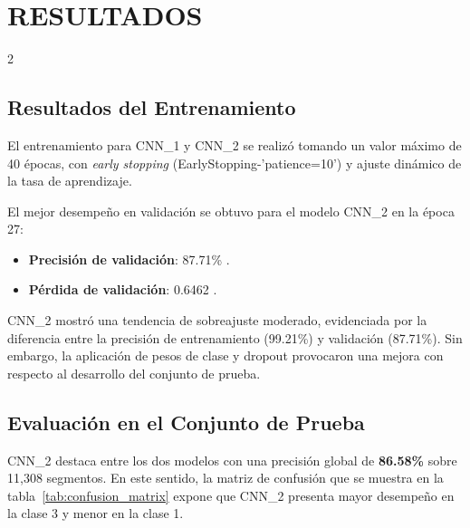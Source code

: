 \documentclass[12pt]{report}
\newenvironment{tightmulticols}{%
  \begin{multicols}{2}
  \setlength{\parskip}{1.2pt}
  \linespread{1}\selectfont
}{%
  \end{multicols}
}
\begin{document}
\pagebreak


\chapter{RESULTADOS}
\vspace{-3em}

\begin{tightmulticols}

\section{Resultados del Entrenamiento}

\noindent El entrenamiento para CNN\_1 y CNN\_2 se realizó tomando un valor máximo de 40 épocas, con \textit{early stopping} (EarlyStopping-'patience=10') y ajuste dinámico de la tasa de aprendizaje.

\par El mejor desempeño en validación se obtuvo para el modelo CNN\_2 en la época 27:

\begin{itemize}
    \item \textbf{Precisión de validación}: 87.71\% .
    \item \textbf{Pérdida de validación}: 0.6462 .
\end{itemize}

\noindent CNN\_2 mostró una tendencia de sobreajuste moderado, evidenciada por la diferencia entre la precisión de entrenamiento (99.21\%) y validación (87.71\%). Sin embargo, la aplicación de pesos de clase y dropout provocaron una mejora con respecto al desarrollo del conjunto de prueba.

\section{Evaluación en el Conjunto de Prueba}

\noindent CNN\_2 destaca entre los dos modelos con una precisión global de \textbf{86.58\%} sobre 11,308 segmentos. En  este sentido, la matriz de confusión que se muestra en la tabla~\ref{tab:confusion_matrix} expone que CNN\_2 presenta mayor desempeño en la clase 3 y menor en la clase 1.

\end{tightmulticols}
\end{document}
